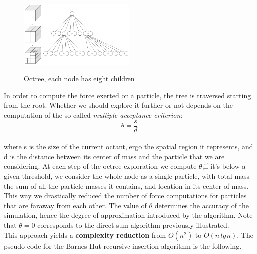 \documentclass{article}
\begin{document}
\begin{figure} [h]
    \centering
    \includegraphics[width=0.5\textwidth]
    {images/octree.png}
    \label{fig:my_label}
    \caption*{Octree, each node has eight children}
\end{figure}

In order to compute the force exerted on a particle, the tree is traversed starting from the root. Whether we should explore it further or not depends on the computation of the so called \textit{multiple acceptance criterion}: \[\theta = \frac{s}{d}\] \\
\noindent where s is the size of the current octant, ergo the spatial region it represents, and d is the distance between its center of mass and the particle that we are considering. At each step of the octree exploration we compute $\theta$;if it's below a given threshold, we consider the whole node as a single particle, with total mass the sum of all the particle masses it contains, and location in its center of mass. This way we drastically reduced the number of force computations for particles that are faraway from each other. The value of $\theta$ determines the accuracy of the simulation, hence the degree of approximation introduced by the algorithm. Note that $\theta = 0$ corresponds to the direct-sum algorithm previously illustrated. \\
This approach yields a \textbf{complexity reduction} from $O(n^2)$ to $O(n \hspace{2pt} lg \hspace{1pt} n)$. \cite{pfalzner1997many}
The pseudo code for the Barnes-Hut recursive insertion algorithm is the following. 
\end{document}
